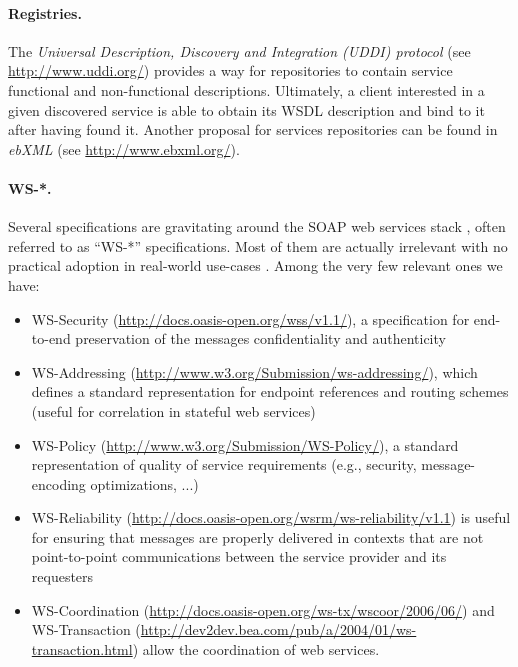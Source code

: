 \paragraph{Registries.}
The \emph{Universal Description, Discovery and Integration (UDDI) protocol} (see \url{http://www.uddi.org/}) provides a way for repositories to contain service functional and non-functional descriptions. Ultimately, a client interested in a given discovered service is able to obtain its WSDL description and bind to it after having found it. Another proposal for services repositories can be found in \emph{ebXML} (see \url{http://www.ebxml.org/}).

\paragraph{WS-*.}
Several specifications are gravitating around the SOAP web services stack \cite{HMBBFC+06}, often referred to as ``WS-*'' specifications. Most of them are actually irrelevant with no practical adoption in real-world use-cases \cite{WS-standards}. Among the very few relevant ones we have:
\begin{itemize}
  
  \item WS-Security (\url{http://docs.oasis-open.org/wss/v1.1/}), a specification for end-to-end preservation of the messages confidentiality and authenticity
  
  \item WS-Addressing (\url{http://www.w3.org/Submission/ws-addressing/}), which defines a standard representation for endpoint references and routing schemes (useful for correlation in stateful web services)
  
  \item WS-Policy (\url{http://www.w3.org/Submission/WS-Policy/}), a standard representation of quality of service requirements (e.g., security, message-encoding optimizations, ...)
  
  \item WS-Reliability (\url{http://docs.oasis-open.org/wsrm/ws-reliability/v1.1}) is useful for ensuring that messages are properly delivered in contexts that are not point-to-point communications between the service provider and its requesters
  
  \item WS-Coordination (\url{http://docs.oasis-open.org/ws-tx/wscoor/2006/06/}) and WS-Transaction (\url{http://dev2dev.bea.com/pub/a/2004/01/ws-transaction.html}) allow the coordination of web services.
  
\end{itemize}

